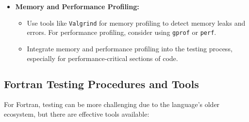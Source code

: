 \documentclass{ol-softwaremanual}
\begin{document}
\begin{itemize}
    \item \textbf{Memory and Performance Profiling:}
    \begin{itemize}
        \item Use tools like \texttt{Valgrind} for memory profiling to detect memory leaks and errors. For performance profiling, consider using \texttt{gprof} or \texttt{perf}.
        \item Integrate memory and performance profiling into the testing process, especially for performance-critical sections of code.
    \end{itemize}
\end{itemize}

\subsection{Fortran Testing Procedures and Tools}

For Fortran, testing can be more challenging due to the language's older ecosystem, but there are effective tools available:
\end{document}
